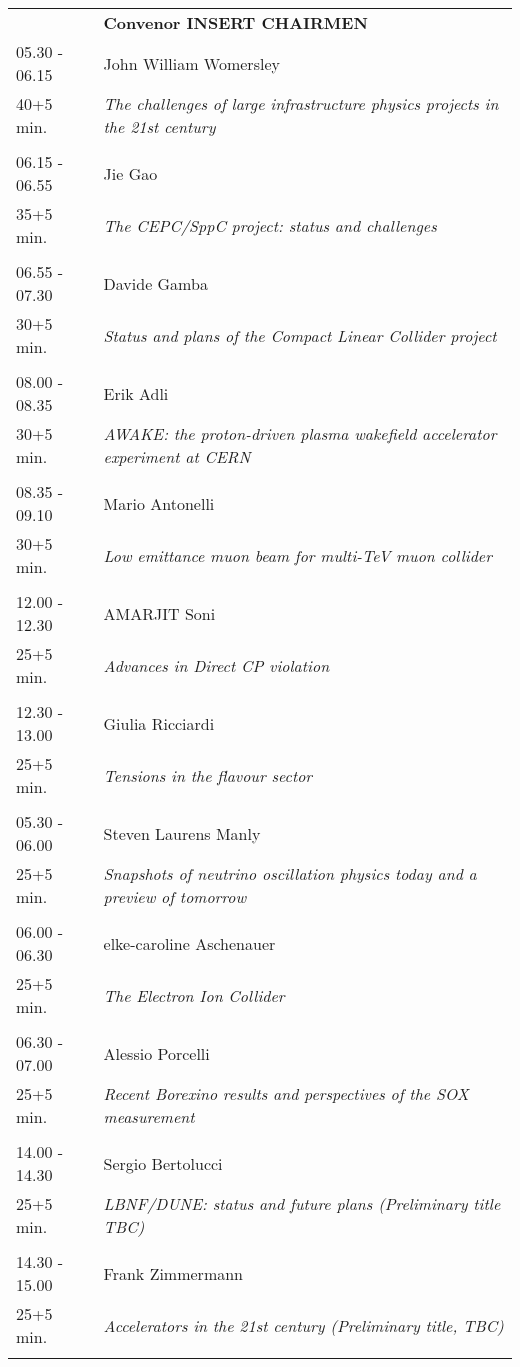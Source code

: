 \begin{longtable}{p{3cm}p{13cm}}
&\hfill {\bf Convenor INSERT CHAIRMEN }\\ 
05.30 - 06.15 & John William Womersley\\ 
40+5 min. & {\it The challenges of large infrastructure physics projects in the 21st century}\\ 
 & \\ 
06.15 - 06.55 & Jie Gao\\ 
35+5 min. & {\it The CEPC/SppC project: status and challenges}\\ 
 & \\ 
06.55 - 07.30 & Davide Gamba\\ 
30+5 min. & {\it Status and plans of the Compact Linear Collider project}\\ 
 & \\ 
08.00 - 08.35 & Erik Adli\\ 
30+5 min. & {\it AWAKE: the proton-driven plasma wakefield accelerator experiment at CERN}\\ 
 & \\ 
08.35 - 09.10 & Mario Antonelli\\ 
30+5 min. & {\it Low emittance muon beam for multi-TeV muon collider}\\ 
 & \\ 
12.00 - 12.30 & AMARJIT Soni\\ 
25+5 min. & {\it Advances in Direct CP violation}\\ 
 & \\ 
12.30 - 13.00 & Giulia Ricciardi\\ 
25+5 min. & {\it Tensions in the flavour sector}\\ 
 & \\ 
05.30 - 06.00 & Steven Laurens Manly\\ 
25+5 min. & {\it Snapshots of neutrino oscillation physics today and a preview of tomorrow}\\ 
 & \\ 
06.00 - 06.30 & elke-caroline Aschenauer\\ 
25+5 min. & {\it The Electron Ion Collider}\\ 
 & \\ 
06.30 - 07.00 & Alessio Porcelli\\ 
25+5 min. & {\it Recent Borexino results and perspectives of the SOX measurement}\\ 
 & \\ 
14.00 - 14.30 & Sergio Bertolucci\\ 
25+5 min. & {\it LBNF/DUNE: status and future plans (Preliminary title TBC)}\\ 
 & \\ 
14.30 - 15.00 & Frank Zimmermann\\ 
25+5 min. & {\it Accelerators in the 21st century (Preliminary title, TBC)}\\ 
 & \\ 
\end{longtable}

